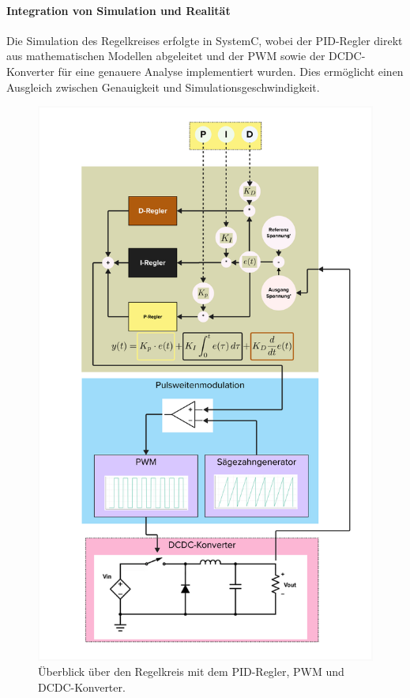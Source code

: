\paragraph{Integration von Simulation und Realität}
Die Simulation des Regelkreises erfolgte in SystemC, wobei der PID-Regler direkt aus mathematischen Modellen abgeleitet und der PWM sowie der DCDC-Konverter für eine genauere Analyse implementiert wurden. Dies ermöglicht einen Ausgleich zwischen Genauigkeit und Simulationsgeschwindigkeit.


\begin{figure}[htbp]
    \centering
    \includegraphics[width=0.99\linewidth]{3Experiment/2Experiment/3PID_Gesteuerter_DCDC_Converter.png}
    \caption{Überblick über den Regelkreis mit dem PID-Regler, PWM und DCDC-Konverter.}
    \label{fig:Regelkreis_Überblick}
\end{figure}
